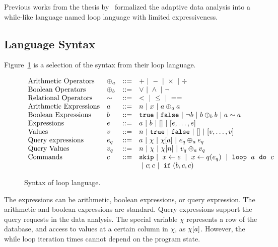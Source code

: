 Previous works from {the thesis by~\cite{weihao22}} formalized the adaptive data analysis into a while-like language named loop language with limited expressiveness.
\subsection{Language Syntax}
Figure~\ref{fig:prework_syntax} is a selection of the syntax from their loop language.
{\small
\begin{figure}
\[
\begin{array}{llll}
 \mbox{Arithmetic Operators} & \oplus_a & ::= & + ~|~ - ~|~ \times 
%
~|~ \div \\ 
 \mbox{Boolean Operators} & \oplus_b & ::= & \lor ~|~ \land ~|~ \neg\\
 \mbox{Relational Operators} & \sim & ::= & < ~|~ \leq ~|~ == \\ 
\mbox{Arithmetic Expressions} & \aexpr & ::= & 
 n ~|~ x ~|~ \aexpr \oplus_a \aexpr \\
\mbox{Boolean Expressions} & \bexpr & ::= & 
 \etrue ~|~ \efalse ~|~ \neg \bexpr
 ~|~ \bexpr \oplus_b \bexpr
 ~|~ \aexpr \sim \aexpr \\
\mbox{Expressions} & \expr & ::= & \aexpr ~|~ \bexpr ~|~ [] ~|~ [\expr, \dots, \expr] \\ 
\mbox{Values} & v & ::= & n ~|~ \etrue ~|~ \efalse ~|~ [] ~|~ [v, \dots, v] \\
\mbox{Query expressions} & \expr_q & ::= & \aexpr ~|~ \chi ~|~ \chi[\aexpr] ~|~ \expr_q \oplus_a \expr_q \\
\mbox{Query Values} & v_q & ::= & n ~|~ \chi ~|~ \chi[n] ~|~ v_q \oplus_a v_q \\
\mbox{Commands} & c & ::= & \eskip ~|~ \assign x \expr ~|~ \assign{x}{ q(\expr_q)}
%
~|~ \eloop ~ \aexpr ~ \edo ~ c \\ &&& ~|~ c;c ~|~ \eif(\bexpr, c, c)
\end{array}
\]
 \caption{Syntax of loop language.}
 \label{fig:prework_syntax}
\end{figure}
}
The expressions can be arithmetic, boolean expressions, or query expression.
The arithmetic and boolean expressions are standard.
Query expressions support the query requests in the data analysis.
The special variable $\chi$ represents a row of the database,
and access to values at a certain column in $\chi$, as $\chi[a]$.
However, the while loop iteration times cannot depend on the program state.
%
